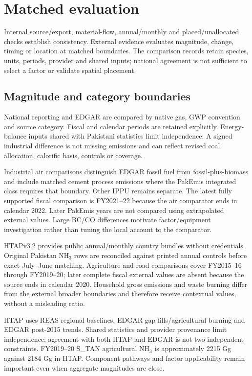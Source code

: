 \section{Matched evaluation}\label{sec:benchmarks}
Internal source/export, material-flow, annual/monthly and placed/unallocated checks establish consistency. External evidence evaluates magnitude, change, timing or location at matched boundaries. The comparison records retain species, units, periods, provider and shared inputs; national agreement is not sufficient to select a factor or validate spatial placement.

\subsection{Magnitude and category boundaries}\label{sec:btr}
National reporting and EDGAR are compared by native gas, GWP convention and source category. Fiscal and calendar periods are retained explicitly. Energy-balance inputs shared with Pakistani statistics limit independence. A signed industrial difference is not missing emissions and can reflect revised coal allocation, calorific basis, controls or coverage.

Industrial air comparisons distinguish EDGAR fossil fuel from fossil-plus-biomass and include matched cement process emissions where the PakEmis integrated class requires that boundary. Other IPPU remains separate. The latest fully supported fiscal comparison is FY2021--22 because the air comparator ends in calendar 2022. Later PakEmis years are not compared using extrapolated external values. Large BC/CO differences motivate factor/equipment investigation rather than tuning the local account to the comparator.

HTAPv3.2 provides public annual/monthly country bundles without credentials. Original Pakistan NH$_3$ rows are reconciled against printed annual controls before exact July--June matching. Agriculture and road comparisons cover FY2015--16 through FY2019--20; later complete fiscal external values are absent because the source ends in calendar 2020. Household gross emissions and waste burning differ from the external broader boundaries and therefore receive contextual values, without a misleading ratio.

HTAP uses REAS regional baselines, EDGAR gap fills/agricultural burning and EDGAR post-2015 trends. Shared statistics and provider provenance limit independence; agreement with both HTAP and EDGAR is not two independent constraints. FY2019--20 S\_TAN agricultural NH$_3$ is approximately 2215 Gg against 2184 Gg in HTAP. Component pathways and factor applicability remain important even when aggregate magnitudes are close.

